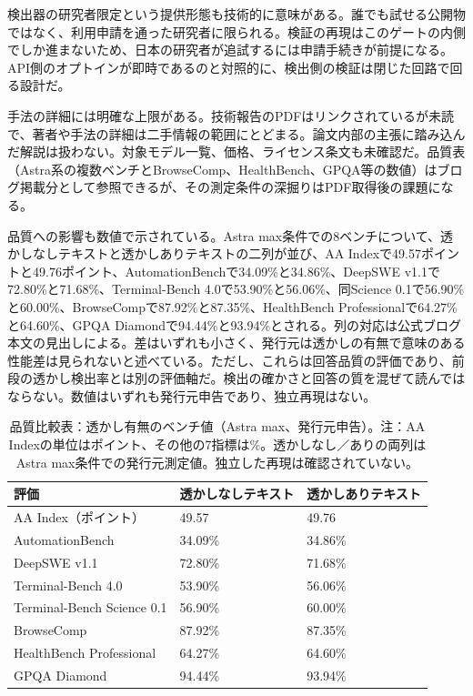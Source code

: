 検出器の研究者限定という提供形態も技術的に意味がある。誰でも試せる公開物ではなく、利用申請を通った研究者に限られる。検証の再現はこのゲートの内側でしか進まないため、日本の研究者が追試するには申請手続きが前提になる。API側のオプトインが即時であるのと対照的に、検出側の検証は閉じた回路で回る設計だ。\cite{textgrain}

手法の詳細には明確な上限がある。技術報告のPDFはリンクされているが未読で、著者や手法の詳細は二手情報の範囲にとどまる。論文内部の主張に踏み込んだ解説は扱わない。対象モデル一覧、価格、ライセンス条文も未確認だ。品質表（Astra系の複数ベンチとBrowseComp、HealthBench、GPQA等の数値）はブログ掲載分として参照できるが、その測定条件の深掘りはPDF取得後の課題になる。\cite{textgrain}

品質への影響も数値で示されている。Astra max条件での8ベンチについて、透かしなしテキストと透かしありテキストの二列が並び、AA Indexで49.57ポイントと49.76ポイント、AutomationBenchで34.09\%と34.86\%、DeepSWE v1.1で72.80\%と71.68\%、Terminal-Bench 4.0で53.90\%と56.06\%、同Science 0.1で56.90\%と60.00\%、BrowseCompで87.92\%と87.35\%、HealthBench Professionalで64.27\%と64.60\%、GPQA Diamondで94.44\%と93.94\%とされる。列の対応は公式ブログ本文の見出しによる。差はいずれも小さく、発行元は透かしの有無で意味のある性能差は見られないと述べている。ただし、これらは回答品質の評価であり、前段の透かし検出率とは別の評価軸だ。検出の確かさと回答の質を混ぜて読んではならない。数値はいずれも発行元申告であり、独立再現はない。\cite{textgrain}

\begin{table}[htbp]
\centering\footnotesize
\begin{tabularx}{0.98\linewidth}{@{}lXX@{}}
\toprule
評価 & 透かしなしテキスト & 透かしありテキスト \\
\midrule
AA Index（ポイント） & 49.57 & 49.76 \\
AutomationBench & 34.09\% & 34.86\% \\
DeepSWE v1.1 & 72.80\% & 71.68\% \\
Terminal-Bench 4.0 & 53.90\% & 56.06\% \\
Terminal-Bench Science 0.1 & 56.90\% & 60.00\% \\
BrowseComp & 87.92\% & 87.35\% \\
HealthBench Professional & 64.27\% & 64.60\% \\
GPQA Diamond & 94.44\% & 93.94\% \\
\bottomrule
\end{tabularx}
\caption{品質比較表：透かし有無のベンチ値（Astra max、発行元申告）。注：AA Indexの単位はポイント、その他の7指標は\%。透かしなし／ありの両列はAstra max条件での発行元測定値。独立した再現は確認されていない。}
\end{table}
\noindent \cite{textgrain}

